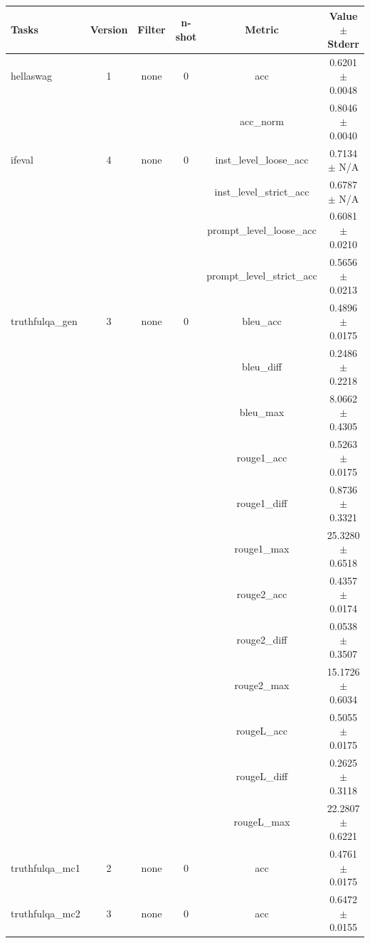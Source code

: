 \documentclass{ifacconf}
\begin{document}
\begin{strip}
\begin{minipage}{\textwidth}
			\begin{table}[H]
				\centering
				\begin{tabular}{|l|c|c|c|c|c|}
					\hline
					\textbf{Tasks} & \textbf{Version} & \textbf{Filter} & \textbf{n-shot} & \textbf{Metric} & \textbf{Value} $\pm$ \textbf{Stderr} \\ \hline
					hellaswag & 1 & none & 0 & acc & 0.6201 $\pm$ 0.0048 \\ \hline
					& & & & acc\_norm & 0.8046 $\pm$ 0.0040 \\ \hline
					ifeval & 4 & none & 0 & inst\_level\_loose\_acc & 0.7134 $\pm$ N/A \\ \hline
					& & & & inst\_level\_strict\_acc & 0.6787 $\pm$ N/A \\ \hline
					& & & & prompt\_level\_loose\_acc & 0.6081 $\pm$ 0.0210 \\ \hline
					& & & & prompt\_level\_strict\_acc & 0.5656 $\pm$ 0.0213 \\ \hline
					truthfulqa\_gen & 3 & none & 0 & bleu\_acc & 0.4896 $\pm$ 0.0175 \\ \hline
					& & & & bleu\_diff & 0.2486 $\pm$ 0.2218 \\ \hline
					& & & & bleu\_max & 8.0662 $\pm$ 0.4305 \\ \hline
					& & & & rouge1\_acc & 0.5263 $\pm$ 0.0175 \\ \hline
					& & & & rouge1\_diff & 0.8736 $\pm$ 0.3321 \\ \hline
					& & & & rouge1\_max & 25.3280 $\pm$ 0.6518 \\ \hline
					& & & & rouge2\_acc & 0.4357 $\pm$ 0.0174 \\ \hline
					& & & & rouge2\_diff & 0.0538 $\pm$ 0.3507 \\ \hline
					& & & & rouge2\_max & 15.1726 $\pm$ 0.6034 \\ \hline
					& & & & rougeL\_acc & 0.5055 $\pm$ 0.0175 \\ \hline
					& & & & rougeL\_diff & 0.2625 $\pm$ 0.3118 \\ \hline
					& & & & rougeL\_max & 22.2807 $\pm$ 0.6221 \\ \hline
					truthfulqa\_mc1 & 2 & none & 0 & acc & 0.4761 $\pm$ 0.0175 \\ \hline
					truthfulqa\_mc2 & 3 & none & 0 & acc & 0.6472 $\pm$ 0.0155 \\ \hline
				\end{tabular}
				\label{tab:qwen25_q8}
			\end{table}
		\end{minipage}
	\end{strip}
	
\end{document}
